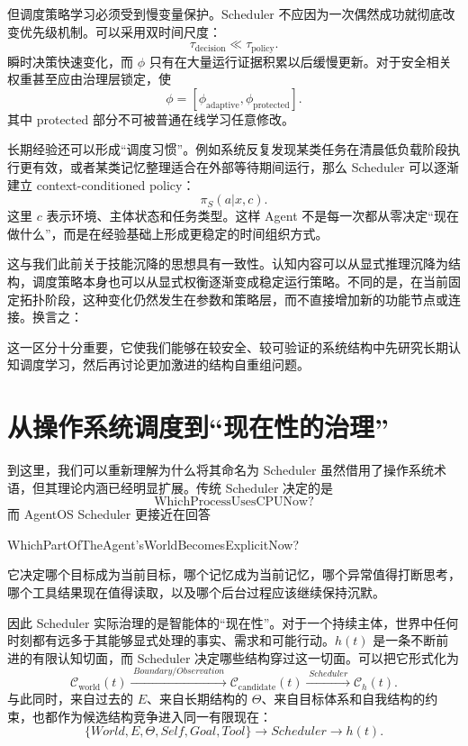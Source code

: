 但调度策略学习必须受到慢变量保护。Scheduler 不应因为一次偶然成功就彻底改变优先级机制。可以采用双时间尺度：
\[
\tau_{\mathrm{decision}}
\ll
\tau_{\mathrm{policy}}.
\]
瞬时决策快速变化，而 $\phi$ 只有在大量运行证据积累以后缓慢更新。对于安全相关权重甚至应由治理层锁定，使
\[
\phi=
[
\phi_{\mathrm{adaptive}},
\phi_{\mathrm{protected}}
].
\]
其中 protected 部分不可被普通在线学习任意修改。

长期经验还可以形成“调度习惯”。例如系统反复发现某类任务在清晨低负载阶段执行更有效，或者某类记忆整理适合在外部等待期间运行，那么 Scheduler 可以逐渐建立 context-conditioned policy：
\[
\pi_S(a|x,c).
\]
这里 $c$ 表示环境、主体状态和任务类型。这样 Agent 不是每一次都从零决定“现在做什么”，而是在经验基础上形成更稳定的时间组织方式。

这与我们此前关于技能沉降的思想具有一致性。认知内容可以从显式推理沉降为结构，调度策略本身也可以从显式权衡逐渐变成稳定运行策略。不同的是，在当前固定拓扑阶段，这种变化仍然发生在参数和策略层，而不直接增加新的功能节点或连接。换言之：
\begin{statementbox}
\centering
{}
\end{statementbox}
这一区分十分重要，它使我们能够在较安全、较可验证的系统结构中先研究长期认知调度学习，然后再讨论更加激进的结构自重组问题。

\section{从操作系统调度到“现在性的治理”}

到这里，我们可以重新理解为什么将其命名为 Scheduler 虽然借用了操作系统术语，但其理论内涵已经明显扩展。传统 Scheduler 决定的是
\[
\text{WhichProcessUsesCPUNow?}
\]
而 AgentOS Scheduler 更接近在回答
\begin{statementbox}
WhichPartOfTheAgent'sWorldBecomesExplicitNow?
\end{statementbox}
它决定哪个目标成为当前目标，哪个记忆成为当前记忆，哪个异常值得打断思考，哪个工具结果现在值得读取，以及哪个后台过程应该继续保持沉默。

因此 Scheduler 实际治理的是智能体的“现在性”。对于一个持续主体，世界中任何时刻都有远多于其能够显式处理的事实、需求和可能行动。$h(t)$ 是一条不断前进的有限认知切面，而 Scheduler 决定哪些结构穿过这一切面。可以把它形式化为
\[
\mathcal C_{\mathrm{world}}(t)
\xrightarrow{\;Boundary/Observation\;}
\mathcal C_{\mathrm{candidate}}(t)
\xrightarrow{\;Scheduler\;}
\mathcal C_h(t).
\]
与此同时，来自过去的 $E$、来自长期结构的 $\Theta$、来自目标体系和自我结构的约束，也都作为候选结构竞争进入同一有限现在：
\[
\{
World,
E,
\Theta,
Self,
Goal,
Tool
\}
\rightarrow
Scheduler
\rightarrow
h(t).
\]

